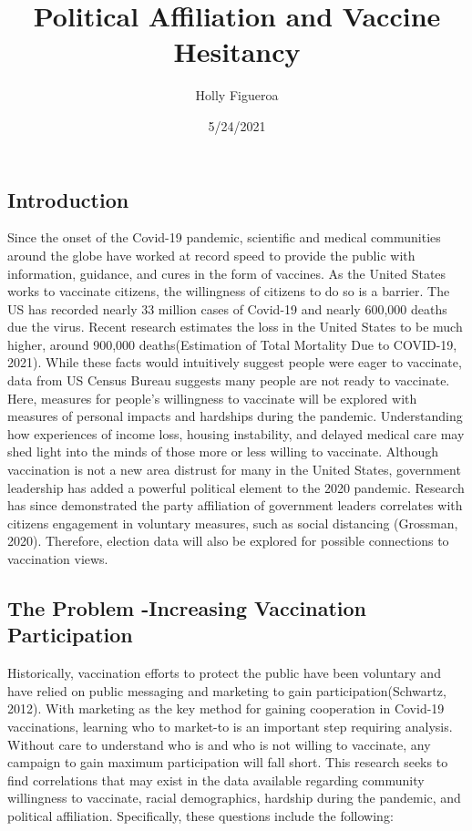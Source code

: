 \documentclass[
]{article}
\title{Political Affiliation and Vaccine Hesitancy}
\author{Holly Figueroa}
\date{5/24/2021}
\begin{document}
\maketitle

\hypertarget{introduction}{%
\subsection{Introduction}\label{introduction}}

Since the onset of the Covid-19 pandemic, scientific and medical
communities around the globe have worked at record speed to provide the
public with information, guidance, and cures in the form of vaccines. As
the United States works to vaccinate citizens, the willingness of
citizens to do so is a barrier. The US has recorded nearly 33 million
cases of Covid-19 and nearly 600,000 deaths due the virus. Recent
research estimates the loss in the United States to be much higher,
around 900,000 deaths(Estimation of Total Mortality Due to COVID-19,
2021). While these facts would intuitively suggest people were eager to
vaccinate, data from US Census Bureau suggests many people are not ready
to vaccinate. Here, measures for people's willingness to vaccinate will
be explored with measures of personal impacts and hardships during the
pandemic. Understanding how experiences of income loss, housing
instability, and delayed medical care may shed light into the minds of
those more or less willing to vaccinate. Although vaccination is not a
new area distrust for many in the United States, government leadership
has added a powerful political element to the 2020 pandemic. Research
has since demonstrated the party affiliation of government leaders
correlates with citizens engagement in voluntary measures, such as
social distancing (Grossman, 2020). Therefore, election data will also
be explored for possible connections to vaccination views.

\hypertarget{the-problem--increasing-vaccination-participation}{%
\subsection{The Problem -Increasing Vaccination
Participation}\label{the-problem--increasing-vaccination-participation}}

Historically, vaccination efforts to protect the public have been
voluntary and have relied on public messaging and marketing to gain
participation(Schwartz, 2012). With marketing as the key method for
gaining cooperation in Covid-19 vaccinations, learning who to market-to
is an important step requiring analysis. Without care to understand who
is and who is not willing to vaccinate, any campaign to gain maximum
participation will fall short. This research seeks to find correlations
that may exist in the data available regarding community willingness to
vaccinate, racial demographics, hardship during the pandemic, and
political affiliation. Specifically, these questions include the
following:
\end{document}

